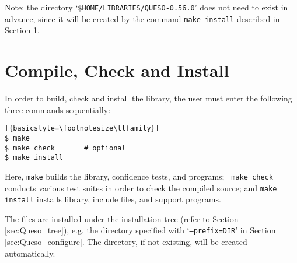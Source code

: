 Note: the directory `\verb+$HOME/LIBRARIES/QUESO-0.56.0+' does not need to exist in advance, since it will be created by the command \verb+make install+ described in Section \ref{sec:install_Queso_make}.


\section{Compile, Check and Install \Queso{}}\label{sec:install_Queso_make}
%
In order to build, check and install the library, the user must enter the following three commands sequentially:
\begin{lstlisting}[{basicstyle=\footnotesize\ttfamily}]
$ make
$ make check       # optional
$ make install
\end{lstlisting}

Here, \verb+make+ builds the library, confidence tests, and programs;  \verb+ make check+ conducts various test suites in order to check the compiled source; and \verb+make install+ installs \Queso{} library, include files, and support programs.

The files are installed under the installation tree (refer to Section \ref{sec:Queso_tree}), e.g. the directory specified with `\texttt{--prefix=DIR}' in Section \ref{sec:Queso_configure}. The directory, if not existing, will be created automatically.%

%
%
%
%

